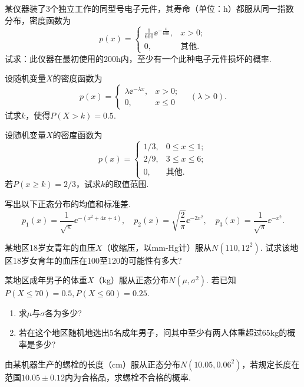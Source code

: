 \begin{xiti}
  \item 某仪器装了3个独立工作的同型号电子元件，其寿命（单位：h）都服从同一指数分布，密度函数为
      \[
        p(x) = \begin{cases}
          \frac1{600} \ee^{-\frac x{600}}, & x>0; \\
          0, & \text{其他}.
        \end{cases}
      \]
      试求：此仪器在最初使用的200h内，至少有一个此种电子元件损坏的概率.

  \item 设随机变量$X$的密度函数为
      \[
        p(x) = \begin{cases}
          \lambda\ee^{-\lambda x}, & x>0; \\
          0, & x\le 0
        \end{cases}\quad (\lambda>0).
      \]
      试求$k$，使得$P(X>k)=0.5$.

  \item 设随机变量$X$的密度函数为
      \[
        p(x) = \begin{cases}
          1/3, & 0\le x\le 1; \\
          2/9, & 3\le x\le 6; \\
          0, & \text{其他}.
        \end{cases}
      \]
      若$P(x\ge k)=2/3$，试求$k$的取值范围.

  \item 写出以下正态分布的均值和标准差.
      \[
        p_1(x) = \frac1{\sqrt\pi}\ee^{-(x^2+4x+4)},\quad
        p_2(x) = \sqrt{\frac2\pi}\ee^{-2x^2},\quad
        p_3(x) = \frac1{\sqrt\pi}\ee^{-x^2}.
      \]

  \item 某地区18岁女青年的血压$X$（收缩压，以mm-Hg计）服从$N(110,12^2)$. 试求该地区18岁女育年的血压在100至120的可能性有多大?

  \item 某地区成年男子的体重$X$（kg）服从正态分布$N(\mu,\sigma^2)$. 若已知$P(X\le 70)=0.5,P(X\le60)=0.25$.
      \begin{enumerate}
        \item 求$\mu$与$\sigma$各为多少?
        \item 若在这个地区随机地选出5名成年男子，问其中至少有两人体重超过65kg的概率是多少?
      \end{enumerate}

  \item 由某机器生产的螺栓的长度（cm）服从正态分布$N(10.05,0.06^2)$，若规定长度在范国$10.05\pm0.12$内为合格品，求螺栓不合格的概率.


\end{xiti}
